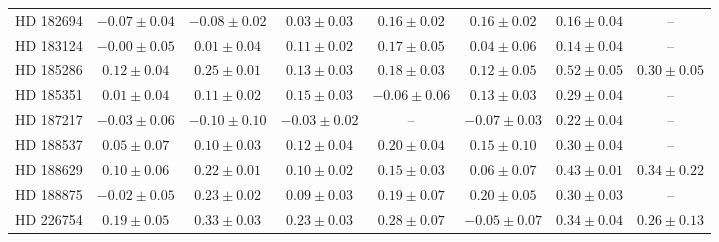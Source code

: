 \begin{table*}
\begin{tabular}{cccccccc}
HD 182694 & $-0.07 \pm 0.04$ & $-0.08 \pm 0.02$ & $0.03 \pm 0.03$ & $0.16 \pm 0.02$ & $0.16 \pm 0.02$ & $0.16 \pm 0.04$ & -- \\
HD 183124 & $-0.00 \pm 0.05$ & $0.01 \pm 0.04$ & $0.11 \pm 0.02$ & $0.17 \pm 0.05$ & $0.04 \pm 0.06$ & $0.14 \pm 0.04$ & -- \\
HD 185286 & $0.12 \pm 0.04$ & $0.25 \pm 0.01$ & $0.13 \pm 0.03$ & $0.18 \pm 0.03$ & $0.12 \pm 0.05$ & $0.52 \pm 0.05$ & $0.30 \pm 0.05$ \\
HD 185351 & $0.01 \pm 0.04$ & $0.11 \pm 0.02$ & $0.15 \pm 0.03$ & $-0.06 \pm 0.06$ & $0.13 \pm 0.03$ & $0.29 \pm 0.04$ & -- \\
HD 187217 & $-0.03 \pm 0.06$ & $-0.10 \pm 0.10$ & $-0.03 \pm 0.02$ & -- & $-0.07 \pm 0.03$ & $0.22 \pm 0.04$ & -- \\
HD 188537 & $0.05 \pm 0.07$ & $0.10 \pm 0.03$ & $0.12 \pm 0.04$ & $0.20 \pm 0.04$ & $0.15 \pm 0.10$ & $0.30 \pm 0.04$ & -- \\
HD 188629 & $0.10 \pm 0.06$ & $0.22 \pm 0.01$ & $0.10 \pm 0.02$ & $0.15 \pm 0.03$ & $0.06 \pm 0.07$ & $0.43 \pm 0.01$ & $0.34 \pm 0.22$ \\
HD 188875 & $-0.02 \pm 0.05$ & $0.23 \pm 0.02$ & $0.09 \pm 0.03$ & $0.19 \pm 0.07$ & $0.20 \pm 0.05$ & $0.30 \pm 0.03$ & -- \\
HD 226754 & $0.19 \pm 0.05$ & $0.33 \pm 0.03$ & $0.23 \pm 0.03$ & $0.28 \pm 0.07$ & $-0.05 \pm 0.07$ & $0.34 \pm 0.04$ & $0.26 \pm 0.13$ \\
\hline
\end{tabular}
\end{table*}
